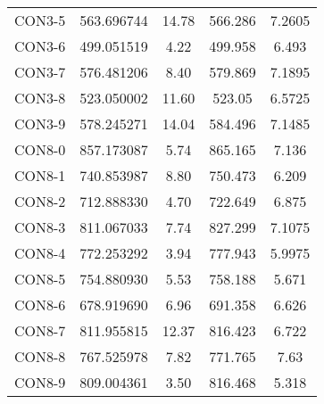 \begin{table}[ht]
\begin{tabular}{c c c c c}
CON3-5 & 563.696744 & 14.78 & 566.286 & 7.2605 \\
CON3-6 & 499.051519 & 4.22 & 499.958 & 6.493 \\
CON3-7 & 576.481206 & 8.40 & 579.869 & 7.1895 \\
CON3-8 & 523.050002 & 11.60 & 523.05 & 6.5725 \\
CON3-9 & 578.245271 & 14.04 & 584.496 & 7.1485 \\
CON8-0 & 857.173087 & 5.74 & 865.165 & 7.136 \\
CON8-1 & 740.853987 & 8.80 & 750.473 & 6.209 \\
CON8-2 & 712.888330 & 4.70 & 722.649 & 6.875 \\
CON8-3 & 811.067033 & 7.74 & 827.299 & 7.1075 \\
CON8-4 & 772.253292 & 3.94 & 777.943 & 5.9975 \\
CON8-5 & 754.880930 & 5.53 & 758.188 & 5.671 \\
CON8-6 & 678.919690 & 6.96 & 691.358 & 6.626 \\
CON8-7 & 811.955815 & 12.37 & 816.423 & 6.722 \\
CON8-8 & 767.525978 & 7.82 & 771.765 & 7.63 \\
CON8-9 & 809.004361 & 3.50 & 816.468 & 5.318 \\
[1ex]\hline
\end{tabular}
\label{table:nonlin}
\end{table} \clearpage

